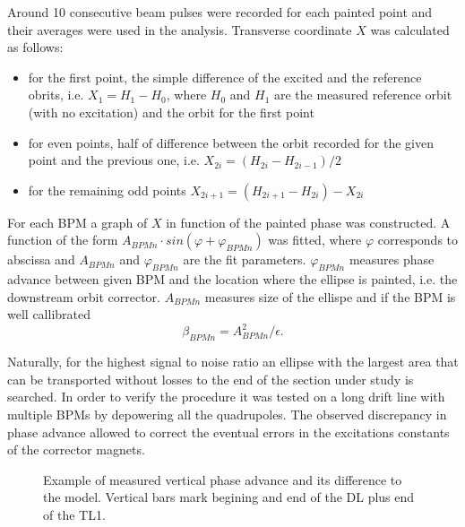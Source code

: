 Around 10 consecutive beam pulses were recorded for each painted point and 
their averages were used in the analysis. 
Transverse coordinate $X$ was calculated as follows:
\begin{itemize}
 \item for the first point, the simple difference of the excited and the reference obrits, i.e. $X_1 = H_1 - H_0$,
       where $H_0$ and $H_1$ are the measured reference orbit (with no excitation) and the orbit for the first point
 \item for even points, half of difference between the orbit recorded for the given point and the previous one, 
       i.e. $X_{2i} = (H_{2i} - H_{2i-1}) / 2 $
 \item for the remaining odd points $X_{2i+1} = (H_{2i+1} - H_{2i}) - X_{2i}$
\end{itemize}

For each BPM a graph of $X$ in function of the painted phase was constructed.
A function of the form $A_{BPMn} \cdot sin(\varphi + \varphi_{BPMn})$ was fitted,
where $\varphi$ corresponds to abscissa and $A_{BPMn}$ and $\varphi_{BPMn}$ are the fit parameters.
$\varphi_{BPMn}$ measures phase advance between given BPM and the location where the
ellipse is painted, i.e. the downstream orbit corrector.
$A_{BPMn}$ measures size of the ellispe and if the BPM is well callibrated
\begin{equation}
\beta_{BPMn} = A^2_{BPMn}/\epsilon.
\label{eq:betaampl}
\end{equation}

Naturally, for the highest signal to noise ratio an ellipse with the largest area that 
can be transported without losses to the end of the section under study is searched.
In order to verify the procedure it was tested on a long drift line 
with multiple BPMs by depowering all the quadrupoles.
The observed discrepancy in phase advance allowed to correct the eventual errors in 
the excitations constants of the corrector magnets.

\begin{figure}[!h]
 \centering
 \caption{\protect{} Example of measured vertical phase advance and 
          \protect{} its difference to the model.
          Vertical bars mark begining and end of the DL plus end of the TL1. }
 \label{fig:PhSpPhaseMeas}
\end{figure}


